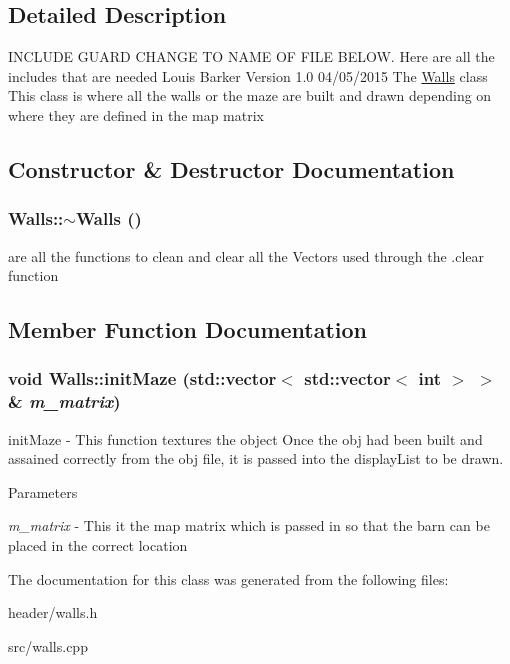 \subsection{Detailed Description}
INCLUDE GUARD CHANGE TO NAME OF FILE BELOW. Here are all the includes that are needed Louis Barker Version 1.0 04/05/2015 The \hyperlink{classWalls}{Walls} class This class is where all the walls or the maze are built and drawn depending on where they are defined in the map matrix 

\subsection{Constructor \& Destructor Documentation}
\hypertarget{classWalls_a1136e53ddf2cc39aa354e9a02ec98f43}{
\subsubsection[{$\sim$Walls}]{\setlength{\rightskip}{0pt plus 5cm}Walls::$\sim$Walls ()}}
\label{classWalls_a1136e53ddf2cc39aa354e9a02ec98f43}


are all the functions to clean and clear all the Vectors used through the .clear function 

\subsection{Member Function Documentation}
\hypertarget{classWalls_aacfe33e1ef049f1a5091fda57ebc03aa}{
\subsubsection[{initMaze}]{\setlength{\rightskip}{0pt plus 5cm}void Walls::initMaze (std::vector$<$ std::vector$<$ int $>$ $>$ \& {\em m\_\-matrix})}}
\label{classWalls_aacfe33e1ef049f1a5091fda57ebc03aa}


initMaze -\/ This function textures the object Once the obj had been built and assained correctly from the obj file, it is passed into the displayList to be drawn. 
\begin{DoxyParams}{Parameters}
\item[{\em m\_\-matrix}]-\/ This it the map matrix which is passed in so that the barn can be placed in the correct location \end{DoxyParams}


The documentation for this class was generated from the following files:\begin{DoxyCompactItemize}
\item 
header/walls.h\item 
src/walls.cpp\end{DoxyCompactItemize}
